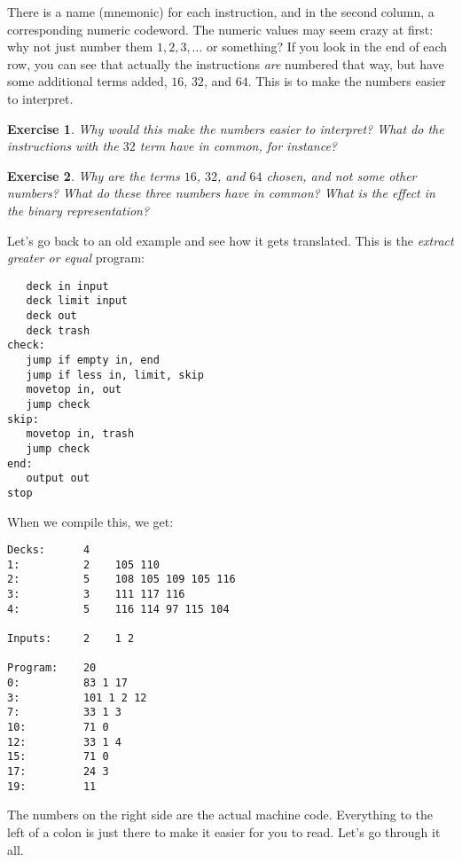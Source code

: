 \documentclass[a4paper,twoside]{tufte-handout}
\newtheorem{exercise}{Exercise}
\begin{document}
\medskip

There is a name (mnemonic) for each instruction, and in the second
column, a corresponding
numeric codeword. The numeric values may seem crazy at first: why not
just number them $1,2,3,\dots$ or something? If you look in the end of
each row, you can see that actually the instructions \emph{are}
numbered that way, but have some additional terms added, $16$, $32$,
and $64$. This is to make the numbers easier to interpret.

\begin{exercise}
  Why would this make the numbers easier to interpret? What do the
  instructions with the $32$ term have in common, for instance?
\end{exercise}

\begin{exercise}
  Why are the terms $16$, $32$, and $64$ chosen, and not some other
  numbers? What do these three numbers have in common? What is the
  effect in the binary representation?
\end{exercise}

Let's go back to an old example and see how it gets translated. This
is the \emph{extract greater or equal} program:

\begin{lstlisting}
   deck in input
   deck limit input
   deck out
   deck trash
check:
   jump if empty in, end
   jump if less in, limit, skip
   movetop in, out
   jump check
skip:
   movetop in, trash
   jump check
end:
   output out
stop
\end{lstlisting}

When we compile this, we get:

\begin{lstlisting}
Decks:      4
1:          2    105 110
2:          5    108 105 109 105 116
3:          3    111 117 116
4:          5    116 114 97 115 104

Inputs:     2    1 2

Program:    20
0:          83 1 17
3:          101 1 2 12
7:          33 1 3
10:         71 0
12:         33 1 4
15:         71 0
17:         24 3
19:         11
\end{lstlisting}

The numbers on the right side are the actual machine code. Everything
to the left of a colon is just there to make it easier for you to
read. Let's go through it all.
\end{document}
